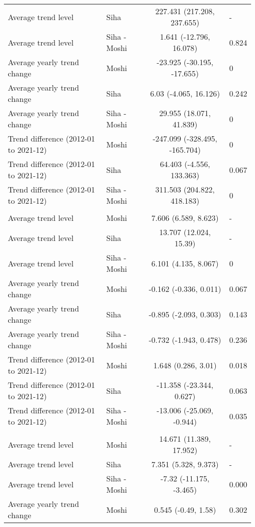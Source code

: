 \begin{longtable}{l|lcl}
Average trend level & Siha & 227.431 (217.208, 237.655) & - \\ 
Average trend level & Siha - Moshi & 1.641 (-12.796, 16.078) & 0.824 \\ 
Average yearly trend change & Moshi & -23.925 (-30.195, -17.655) & 0 \\ 
Average yearly trend change & Siha & 6.03 (-4.065, 16.126) & 0.242 \\ 
Average yearly trend change & Siha - Moshi & 29.955 (18.071, 41.839) & 0 \\ 
Trend difference (2012-01 to 2021-12) & Moshi & -247.099 (-328.495, -165.704) & 0 \\ 
Trend difference (2012-01 to 2021-12) & Siha & 64.403 (-4.556, 133.363) & 0.067 \\ 
Trend difference (2012-01 to 2021-12) & Siha - Moshi & 311.503 (204.822, 418.183) & 0 \\ 
\midrule\addlinespace[2.5pt]
\multicolumn{4}{l}{Snake and Insect Bites} \\ 
\midrule\addlinespace[2.5pt]
Average trend level & Moshi & 7.606 (6.589, 8.623) & - \\ 
Average trend level & Siha & 13.707 (12.024, 15.39) & - \\ 
Average trend level & Siha - Moshi & 6.101 (4.135, 8.067) & 0 \\ 
Average yearly trend change & Moshi & -0.162 (-0.336, 0.011) & 0.067 \\ 
Average yearly trend change & Siha & -0.895 (-2.093, 0.303) & 0.143 \\ 
Average yearly trend change & Siha - Moshi & -0.732 (-1.943, 0.478) & 0.236 \\ 
Trend difference (2012-01 to 2021-12) & Moshi & 1.648 (0.286, 3.01) & 0.018 \\ 
Trend difference (2012-01 to 2021-12) & Siha & -11.358 (-23.344, 0.627) & 0.063 \\ 
Trend difference (2012-01 to 2021-12) & Siha - Moshi & -13.006 (-25.069, -0.944) & 0.035 \\ 
\midrule\addlinespace[2.5pt]
\multicolumn{4}{l}{Substance Abuse} \\ 
\midrule\addlinespace[2.5pt]
Average trend level & Moshi & 14.671 (11.389, 17.952) & - \\ 
Average trend level & Siha & 7.351 (5.328, 9.373) & - \\ 
Average trend level & Siha - Moshi & -7.32 (-11.175, -3.465) & 0.000 \\ 
Average yearly trend change & Moshi & 0.545 (-0.49, 1.58) & 0.302 \\ 

\end{longtable}

